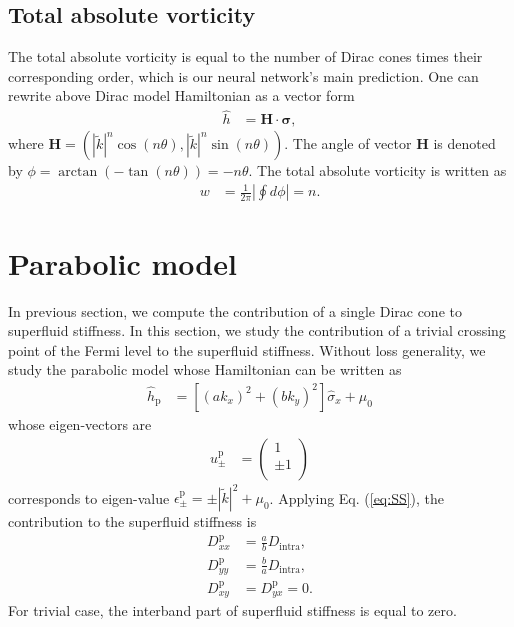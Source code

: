\documentclass{article}
\begin{document}
\subsection{Total absolute vorticity}
The total absolute vorticity is equal to the number of Dirac cones times their corresponding order, which is our neural network's main prediction. One can rewrite above Dirac model Hamiltonian as a vector form 
\begin{align}
    \hat{h} &= \mathbf{H} \cdot \bm{\sigma},
\end{align}
where $ \mathbf{H}= \left(|\widetilde{k}|^n \cos(n \theta),|\widetilde{k}|^n \sin(n \theta) \right) $. The angle of vector $ \mathbf{H} $ is denoted by $ \phi = \arctan(-\tan(n \theta)) = -n \theta $. The total absolute vorticity is written as 
\begin{align}
    w &= \frac{1}{2\pi}\left\vert \oint d \phi  \right\vert =  n. 
\end{align}

\section{Parabolic model}
In previous section, we compute the contribution of a single Dirac cone to superfluid stiffness. In this section, we study the contribution of a trivial crossing point of the Fermi level to the superfluid stiffness. Without loss generality, we study the parabolic model whose Hamiltonian can be written as 
\begin{align}
    \hat{h}_{\textrm{p}} &= \left[(a k_x)^2 + (b k_y)^2\right] \hat{\sigma}_x + \mu_0 
\end{align}
whose eigen-vectors are 
\begin{align}
    u^{\textrm{p}} _\pm &= \left(\begin{array}{c}
         1 \\
         \pm 1 \\
    \end{array}\right)
\end{align}
corresponds to eigen-value $\epsilon^{\textrm{p}}_\pm =  \pm |\widetilde{k}|^2 + \mu_0  $. Applying Eq. (\ref{eq:SS}), the contribution to the superfluid stiffness is 
\begin{align}
    D^{\textrm{p}} _{xx} &= \frac{a}{b}D_{\textrm{intra}}, \\   
    D^{\textrm{p}} _{yy} &= \frac{b}{a}D_{\textrm{intra}}, \\   
    D^{\textrm{p}} _{xy} &= D^{\textrm{p}}_{yx} =0. 
\end{align}
For trivial case, the interband part of superfluid stiffness is equal to zero. 
\end{document}
